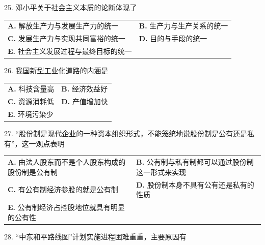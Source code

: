 \documentclass[UTF8,11pt]{ctexart}
\begin{document}
25. 邓小平关于社会主义本质的论断体现了


\begin{center}\begin{tabular}{>{\raggedright\arraybackslash}p{\dimexpr(\linewidth-4\tabcolsep)/2\relax}>{\raggedright\arraybackslash}p{\dimexpr(\linewidth-4\tabcolsep)/2\relax}}
\textbf{A.} 解放生产力与发展生产力的统一 & \textbf{B.} 生产力与生产关系的统一\\[.35em]
\textbf{C.} 发展生产力与实现共同富裕的统一 & \textbf{D.} 目的与手段的统一\\[.35em]
\textbf{E.} 社会主义发展过程与最终目标的统一 & \\[.35em]\end{tabular}\end{center}

26. 我国新型工业化道路的内涵是


\begin{center}\begin{tabular}{>{\raggedright\arraybackslash}p{\dimexpr(\linewidth-4\tabcolsep)/2\relax}>{\raggedright\arraybackslash}p{\dimexpr(\linewidth-4\tabcolsep)/2\relax}}
\textbf{A.} 科技含量高 & \textbf{B.} 经济效益好\\[.35em]
\textbf{C.} 资源消耗低 & \textbf{D.} 产值增加快\\[.35em]
\textbf{E.} 环境污染少 & \\[.35em]\end{tabular}\end{center}

27. “股份制是现代企业的一种资本组织形式，不能笼统地说股份制是公有还是私有”，这一观点表明


\begin{center}\begin{tabular}{>{\raggedright\arraybackslash}p{\dimexpr(\linewidth-4\tabcolsep)/2\relax}>{\raggedright\arraybackslash}p{\dimexpr(\linewidth-4\tabcolsep)/2\relax}}
\textbf{A.} 由法人股东而不是个人股东构成的股份制是公有制 & \textbf{B.} 公有制与私有制都可以通过股份制这一形式来实现\\[.35em]
\textbf{C.} 有公有制经济参股的就是公有制 & \textbf{D.} 股份制本身不具有公有还是私有的性质\\[.35em]
\textbf{E.} 公有制经济占控股地位就具有明显的公有性 & \\[.35em]\end{tabular}\end{center}

28. “中东和平路线图”计划实施进程困难重重，主要原因有
\end{document}
